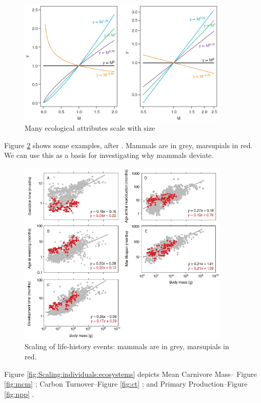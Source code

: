 \documentclass[]{article}
\begin{document}
\begin{figure}[H]
	\caption{Many ecological attributes scale with size}\label{fig:PowerLawScaling}
	\includegraphics[width=0.9\textwidth]{PowerLawScaling}
\end{figure}

Figure \ref{fig:ScalingExamples} shows some examples, after \cite{sibly2012metabolic}. Mammals are in grey, marsupials in red. We can use this as a basis for investigating why mammals deviate.
\begin{figure}[H]
	\caption{Scaling of life-history events: mammals are in grey, marsupials in red.}\label{fig:ScalingExamples}
	\includegraphics[width=0.9\textwidth]{ScalingExamples}
\end{figure}


Figure \ref{fig:Scaling:individuals:ecosystems}	depicts Mean Carnivore Mass-- Figure \ref{fig:mcm} \cite{tucker2014evolutionary}; Carbon Turnover--Figure \ref {fig:ct} \cite{anderson2013altered}; and Primary Production--Figure \ref{fig:npp} \cite{enquist2012land}.
\end{document}
